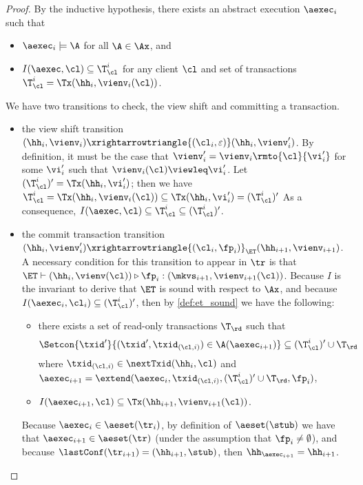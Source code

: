 \begin{proof}
By the inductive hypothesis, there exists an abstract execution $\aexec_i$ such that  
\begin{itemize}
\item $\aexec_{i} \models \A$ for all $\A \in \Ax$, and 
\item $I(\aexec, \cl) \subseteq \T_{\cl}^{i}$ for any client $\cl$ and set of transactions $\T_{\cl}^{i} = \Tx(\hh_{i}, \vienv_{i}(\cl))$.
\end{itemize}

We have two transitions to check, the view shift and committing a transaction.
\begin{itemize}
\item the view shift transition $(\hh_{i}, \vienv_{i}) \xrightarrowtriangle{(\cl_{i}, \varepsilon)} (\hh_{i}, \vienv'_{i})$. 
By definition, it must be the case that $\vienv'_{i} = \vienv_{i}\rmto{\cl}{\vi'_{i}}$ 
for some $\vi'_{i}$ such that $\vienv_{i}(\cl) \viewleq \vi'_{i}$.
Let $(\T_{\cl}^{i})' = \Tx(\hh_{i}, \vi'_{i})$; then we have 
\(
\T_{\cl}^{i} = \Tx(\hh_{i}, \vienv_{i}(\cl)) \subseteq \Tx(\hh_{i}, \vi'_{i}) = (\T_{\cl}^{i})'
\)
As a consequence, $I(\aexec, \cl) \subseteq \T_{\cl}^{i} \subseteq (\T_{\cl}^{i})'$.

\item the commit transaction transition $(\hh_{i}, \vienv_{i}') \xrightarrowtriangle{(\cl_{i}, \fp_{i})}_{\ET} 
(\hh_{i+1}, \vienv_{i+1})$.
A necessary condition for this transition 
to appear in $\tr$ is that $\ET \vdash (\hh_{i}, \vienv(\cl)) \triangleright \fp_{i}: (\mkvs_{i+1},\vienv_{i+1}(\cl))$. 
Because $I$ is the invariant to derive that $\ET$ is sound with respect to $\Ax$, 
and because $I(\aexec_{i}, \cl_{i}) \subseteq (\T^{i}_{\cl})'$, 
then by \cref{def:et_sound} we have the following:
\begin{itemize}
\item there exists a set of read-only transactions $\T_\rd$ 
    such that 
    \[
        \Setcon{\txid' }{ (\txid', \txid_{(\cl, i)}) \in \A(\aexec_{i+1})} \subseteq (\T^{i}_{\cl})' \cup \T_\rd
    \]
where 
$\txid_{(\cl, i)} \in \nextTxid(\hh_{i}, \cl)$
and $\aexec_{i+1} = \extend(\aexec_{i}, \txid_{(\cl, i)}, (\T^{i}_{\cl})' \cup \T_\rd, \fp_{i})$,
\item  $I(\aexec_{i+1}, \cl) \subseteq \Tx(\hh_{i+1}, \vienv_{i+1}(\cl))$.
\end{itemize} 
Because $\aexec_{i} \in \aeset(\tr_{i})$, by definition of $\aeset(\stub)$ we have that 
$\aexec_{i+1} \in \aeset(\tr)$ (under the assumption that $\fp_{i} \neq \emptyset$), 
and because $\lastConf(\tr_{i+1}) = (\hh_{i+1}, \stub)$, then $\hh_{\aexec_{i+1}} = \hh_{i+1}$. 


\end{itemize}
\end{proof}
